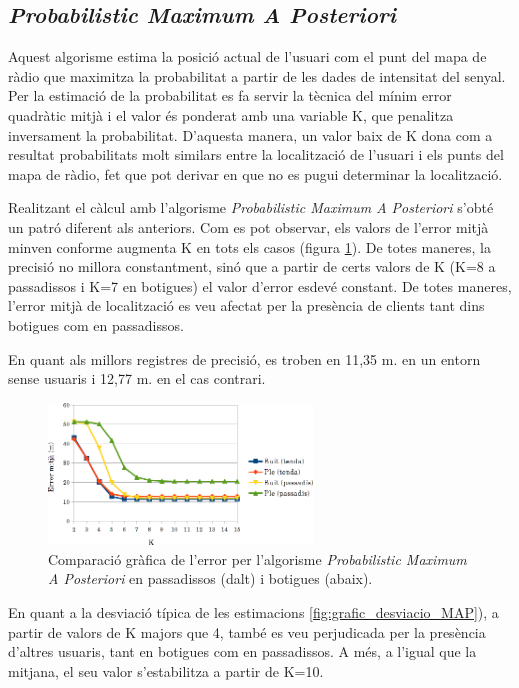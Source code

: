 \subsection{\textit{Probabilistic Maximum A Posteriori}}

Aquest algorisme estima la posició actual de l'usuari com el punt del mapa de ràdio que maximitza la probabilitat a partir de les dades de intensitat del senyal. Per la estimació de la probabilitat es fa servir la tècnica del mínim error quadràtic mitjà i el valor és ponderat amb una variable K, que penalitza inversament la probabilitat. D'aquesta manera, un valor baix de K dona com a resultat probabilitats molt similars entre la localització de l'usuari i els punts del mapa de ràdio, fet que pot derivar en que no es pugui determinar la localització.

Realitzant el càlcul amb l'algorisme \textit{Probabilistic Maximum A Posteriori} s'obté un patró diferent als anteriors. Com es pot observar, els valors de l'error mitjà minven conforme augmenta K en tots els casos (figura \ref{fig:grafic_mitja_MAP}). De totes maneres, la precisió no millora constantment, sinó que a partir de certs valors de K (K=8 a passadissos i K=7 en botigues) el valor d'error esdevé constant. De totes maneres, l'error mitjà de localització es veu afectat per la presència de clients tant dins botigues com en passadissos.

En quant als millors registres de precisió, es troben en 11,35 m. en un entorn sense usuaris i 12,77 m. en el cas contrari.

\begin{figure}[ht]
\begin{center}
\includegraphics[width=7cm]{imatges/map_mitja.png}
\caption{Comparació gràfica de l'error per l'algorisme \textit{Probabilistic Maximum A Posteriori} en passadissos (dalt) i botigues (abaix).}
\label{fig:grafic_mitja_MAP}
\end{center}
\end{figure}

En quant a la desviació típica de les estimacions \ref{fig:grafic_desviacio_MAP}), a partir de valors de K majors que 4, també es veu perjudicada per la presència d'altres usuaris, tant en botigues com en passadissos. A més, a l'igual que la mitjana, el seu valor s'estabilitza a partir de K=10.

